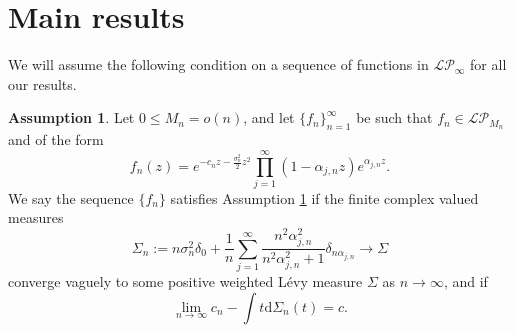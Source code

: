 \documentclass[reqno]{amsart}
\newcommand{\1}{\mathbf{1}}
\newcommand{\dd}{\mathrm{d}}
\newcommand{\LP}{\mathcal{LP}}
\theoremstyle{plain}
\theoremstyle{definition}
\newtheorem{assumption}{Assumption}
\theoremstyle{remark}
\numberwithin{equation}{section}
\begin{document}
\section{Main results}\label{sec:mainresults}
We will assume the following condition on a sequence of functions in $\LP_{\infty}$ for all our results. 
\begin{assumption} \label{assump:main assumption}
	Let $0\leq M_n=o(n)$, and let $\{f_{n}\}_{n=1}^{\infty}$ be such that $f_n\in \LP_{M_n}$ and of the form \begin{equation}
		f_n(z)=e^{-c_{n}z-\frac{\sigma_{n}^2}{2}z^2}\prod_{j=1}^{\infty}\left(1-\alpha_{j,n}z\right)e^{\alpha_{j,n}z}.
	\end{equation} 
	We say the sequence $\{f_n\}$ satisfies Assumption \ref{assump:main assumption} if the finite complex valued measures
	\begin{equation}\label{eq:Sigma_n assumptions}
		\Sigma_{n}:=n\sigma_{n}^2\delta_{0}+\frac{1}{n}\sum_{j=1}^{\infty}\frac{n^2\alpha_{j,n}^2}{n^2\alpha_{j,n}^2+1}\delta_{n\alpha_{j,n}} \to \Sigma
	\end{equation}
	converge vaguely to some positive weighted L\'evy measure $\Sigma$ as $n\to\infty$, and if 
	\begin{equation}\label{eq:c assumptions} \lim\limits_{n\rightarrow\infty}c_{n}-\int t\dd\Sigma_{n}(t)=c.\end{equation} %
	\end{assumption}
\end{document}
